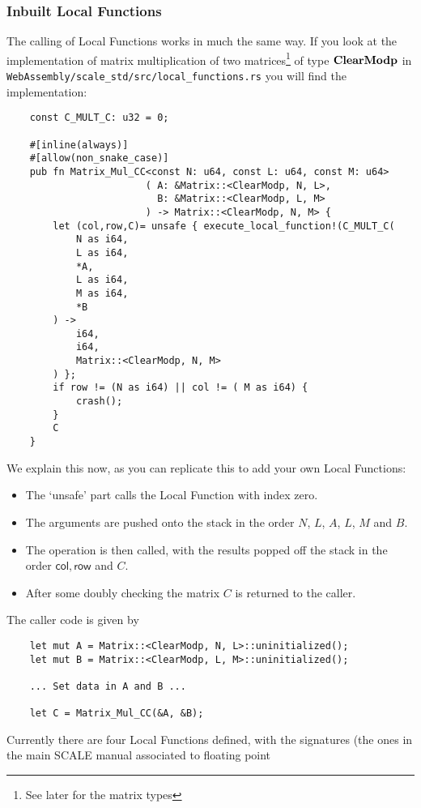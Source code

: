 \subsubsection{Inbuilt Local Functions}
The calling of Local Functions works in much the same way.
If you look at the implementation of matrix multiplication of
two matrices\footnote{See later for the matrix types} 
of type $\mathbf{ClearModp}$ in \verb|WebAssembly/scale_std/src/local_functions.rs|
you will find the implementation:
\begin{lstlisting}
    const C_MULT_C: u32 = 0;

    #[inline(always)]
    #[allow(non_snake_case)]
    pub fn Matrix_Mul_CC<const N: u64, const L: u64, const M: u64>
                        ( A: &Matrix::<ClearModp, N, L>,
                          B: &Matrix::<ClearModp, L, M>
                        ) -> Matrix::<ClearModp, N, M> {
        let (col,row,C)= unsafe { execute_local_function!(C_MULT_C(
            N as i64,
            L as i64,
            *A,
            L as i64,
            M as i64,
            *B
        ) ->
            i64,
            i64,
            Matrix::<ClearModp, N, M>
        ) };
        if row != (N as i64) || col != ( M as i64) {
            crash();
        }
        C
    }
\end{lstlisting}
We explain this now, as you can replicate this to add your own
Local Functions:
\begin{itemize}
\item The `unsafe' part calls the Local Function with index zero.
\item The arguments are pushed onto the stack in the order
$N$, $L$, $A$, $L$, $M$ and $B$.
\item The operation is then called, with the results popped
off the stack in the order $\mathsf{col}, \mathsf{row}$
and $C$.
\item After some doubly checking the matrix $C$ is returned to the 
caller.
\end{itemize}
The caller code is given by
\begin{lstlisting}
    let mut A = Matrix::<ClearModp, N, L>::uninitialized();
    let mut B = Matrix::<ClearModp, L, M>::uninitialized();

    ... Set data in A and B ...

    let C = Matrix_Mul_CC(&A, &B);
\end{lstlisting}
Currently there are four Local Functions defined, with
the signatures  (the ones in the main SCALE manual associated to floating point

